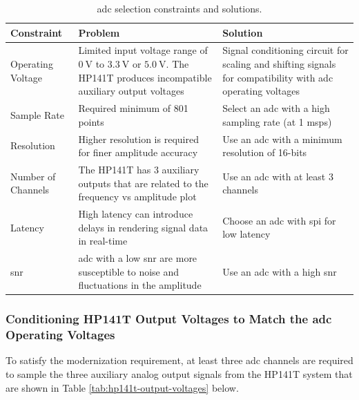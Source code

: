 \documentclass[class=report,11pt,crop=false]{standalone}
\begin{document}
	\begin{table}[!ht]
		\centering
		\begin{tabular}{|m{8em}|m{15em}|m{15em}|}
			\hline
			\cellcolor{cyan!25}\textbf{Constraint}	& \cellcolor{cyan!25}\textbf{Problem}	& \cellcolor{cyan!25}\textbf{Solution}\\
			\hline
			Operating Voltage	& Limited input voltage range of $\SI{0}{\volt}$ to $\SI{3.3}{\volt}$ or $\SI{5.0}{\volt}$. The HP141T produces incompatible auxiliary output voltages	& Signal conditioning circuit for scaling and shifting signals for compatibility with \acrshort{adc} operating voltages\\
			\hline
			Sample Rate			& Required minimum of 801 points & Select an \acrshort{adc} with a high sampling rate (at 1 \acrshort{msps}) \\
			\hline
			Resolution			& Higher resolution is required for finer amplitude accuracy	& Use an \acrshort{adc} with a minimum resolution of 16-bits\\
			\hline
			Number of Channels	& The HP141T has 3 auxiliary outputs that are related to the frequency vs amplitude plot 	& Use an \acrshort{adc} with at least 3 channels\\
			\hline
			Latency				& High latency can introduce delays in rendering signal data in real-time	& Choose an \acrshort{adc} with \acrshort{spi} for low latency\\
			\hline
			\acrshort{snr}	& \acrshort{adc} with a low \acrshort{snr} are more susceptible to noise and fluctuations in the amplitude 	&	Use an \acrshort{adc} with a high \acrshort{snr}\\
			\hline
		\end{tabular}
		\label{tab:adc-constraints}
		\caption{\acrshort{adc} selection constraints and solutions.}
	\end{table}

	\subsubsection{Conditioning HP141T Output Voltages to Match the \acrshort{adc} Operating Voltages}
	
	To satisfy the modernization requirement, at least three \acrshort{adc} channels are required to sample the three auxiliary analog output signals from the HP141T system that are shown in Table \ref{tab:hp141t-output-voltages} below.
	
\end{document}
